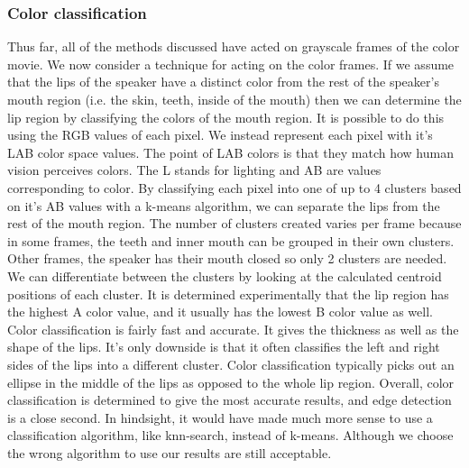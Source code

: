\documentclass[a4paper]{article}
\begin{document}
\subsubsection{Color classification}
Thus far, all of the methods discussed have acted on grayscale frames of the color movie. We now consider a technique for acting on the color frames. If we assume that the lips of the speaker have a distinct color from the rest of the speaker's mouth region (i.e. the skin, teeth, inside of the mouth) then we can determine the lip region by classifying the colors of the mouth region. It is possible to do this using the RGB values of each pixel. We instead represent each pixel with it's LAB color space values. The point of LAB colors  is that they match how human vision perceives colors. The L stands for lighting and AB are values corresponding to color. By classifying each pixel into one of up to 4 clusters based on it's AB values with a k-means algorithm, we can separate the lips from the rest of the mouth region. The number of clusters created varies per frame because in some frames, the teeth and inner mouth can be grouped in their own clusters. Other frames, the speaker has their mouth closed so only 2 clusters are needed. We can differentiate between the clusters by looking at the calculated centroid positions of each cluster. It is determined experimentally that the lip region has the highest A color value, and it usually has the lowest B color value as well.  Color classification is fairly fast and accurate. It gives the thickness as well as the shape of the lips. It's only downside is that it often classifies the left and right sides of the lips into a different cluster. Color classification typically picks out an ellipse in the middle of the lips as opposed to the whole lip region. Overall, color classification is determined to give the most accurate results, and edge detection is a close second. In hindsight, it would have made much more sense to use a classification algorithm, like knn-search, instead of k-means. Although we choose the wrong algorithm to use our results are still acceptable. \par
 
\end{document}
